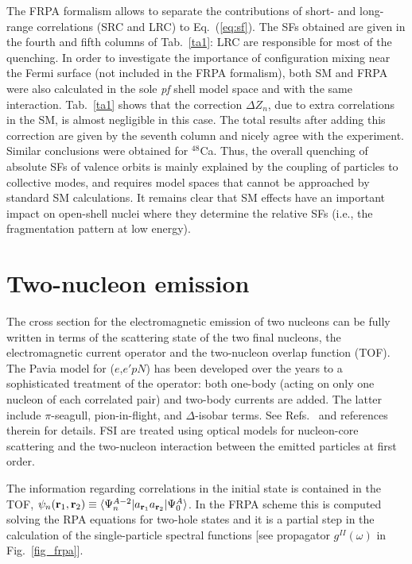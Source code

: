 \documentclass{ws-mpla}
\begin{document}
The FRPA formalism allows to separate the contributions of short- and long-range correlations (SRC and LRC) to Eq.~(\ref{eq:sf})\cite{bar.09d}. The SFs obtained %
are given in the fourth and fifth columns of Tab.~\ref{ta1}: LRC are responsible for most of the quenching.
%
In order to investigate the importance of configuration mixing near the Fermi surface (not included in the FRPA formalism), both SM and FRPA were also calculated in the sole {\em pf} shell model space and with the same interaction.
Tab.~\ref{ta1} shows that the correction $\Delta Z_n$, due to extra correlations in the SM, is almost negligible in this case. The total results after adding this correction are given by the seventh column and  nicely agree with the experiment.
%
Similar conclusions were obtained for $^{48}$Ca.\cite{bar.09d}
%
Thus, the overall quenching of absolute SFs of valence orbits is mainly
explained by the coupling of particles to collective modes,  and requires model spaces
that cannot be approached by standard SM calculations.
%
It remains clear that SM %
effects have an important impact on open-shell nuclei where they determine
the relative SFs (i.e., the fragmentation pattern at low energy).\cite{Tsa.09}


\section*{Two-nucleon emission}

The cross section for the electromagnetic emission of two nucleons 
can be fully written in terms of the scattering
state of the two final nucleons, the electromagnetic current operator
and the two-nucleon overlap function (TOF).
%
The Pavia model for ($e$,$e'pN$) has been developed over the years
to a sophisticated treatment of the operator: both one-body
(acting on only one nucleon of each correlated pair) and two-body
currents are added. The latter include $\pi$-seagull, pion-in-flight, 
and $\Delta$-isobar terms. See Refs.~ and references therein
for details. FSI are treated using optical models for nucleon-core scattering
and the two-nucleon interaction between the emitted particles at first order.

The information regarding correlations in the initial state is contained 
in the TOF,
$\psi_n({\bf r}_1,{\bf r}_2) \equiv
  \langle \Psi^{A-2}_n | a_{{\bf r}_1} a_{{\bf r}_2} | \Psi^{A}_0 \rangle$.
In the FRPA scheme this is computed solving the RPA equations for two-hole
states and it is a partial step in the calculation of the single-particle
spectral functions [see propagator $g^{II}(\omega)$ in Fig.~\ref{fig_frpa}].
\end{document}

